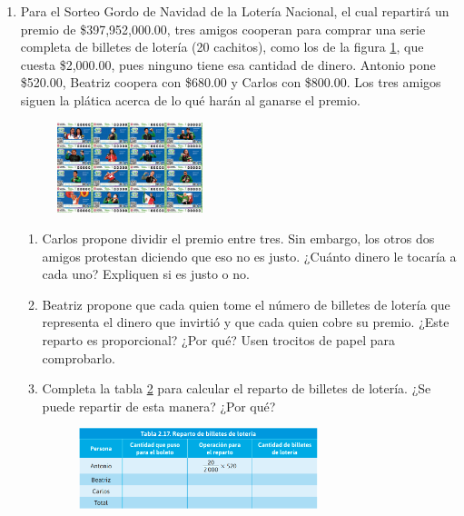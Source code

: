 \documentclass[11pt]{book}
\begin{document}
\begin{enumerate}
  \item Para el Sorteo Gordo de Navidad de la Lotería Nacional, el cual repartirá un premio de \$397,952,000.00, tres amigos
        cooperan para comprar una serie completa de billetes de lotería (20 cachitos), como los de la figura \ref{fig:cachito}, que cuesta
        \$2,000.00, pues ninguno tiene esa cantidad de dinero. Antonio pone \$520.00, Beatriz coopera con \$680.00 y Carlos
        con \$800.00. Los tres amigos siguen la plática acerca de lo qué harán al ganarse el premio.
        \begin{figure}[H]
          \centering
          \includegraphics[width=0.4\textwidth]{cachito}
          \label{fig:cachito}
        \end{figure}
        \begin{enumerate}
          \item Carlos propone dividir el premio entre tres. Sin embargo, los otros dos amigos protestan diciendo que eso no es justo. ¿Cuánto dinero le tocaría a cada uno? Expliquen si es justo o no.
          \item Beatriz propone que cada quien tome el número de billetes de lotería que representa el dinero que invirtió y que cada quien cobre su premio. ¿Este reparto es proporcional? ¿Por qué? Usen trocitos de papel para comprobarlo.
          \item Completa la tabla \ref{tab:reparto_billetes} para calcular el reparto de billetes de lotería. ¿Se puede repartir de esta manera? ¿Por qué?
                \begin{figure}[H]
                  \centering
                  \includegraphics[width=0.7\textwidth]{tabla2.17.png}
                  \label{tab:reparto_billetes}

\end{figure}
\end{enumerate}
\end{enumerate}
\end{document}
